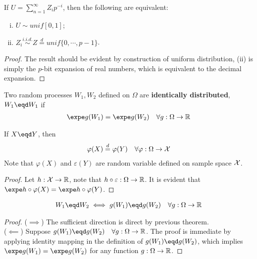\documentclass{article}
\begin{document}
   	\begin{theorem}
   		If $U = \sum_{n=1}^\infty Z_i p^{-i}$, then the following are equivalent:
   		\begin{enumerate}[(i)]
   			\item $U \sim unif[0, 1]$;
   			\item $Z_i \overset{i.i.d.}{\sim} Z \overset{d}{=} unif\{0, \cdots, p-1\}$.
   		\end{enumerate}
   	\end{theorem}
   	
   	\begin{proof}
   		The result should be evident by construction of uniform distribution, (ii) is simply the $p$-bit expansion of real numbers, which is equivalent to the decimal expansion.
   	\end{proof}
   	
   	\begin{definition}
   		Two random processes $W_1, W_2$ defined on $\Omega$ are \textbf{identically distributed}, $W_1 \eqd W_1$ if 
   		\begin{align}
   			\expe g(W_1) = \expe g(W_2) \quad \forall g: \Omega \to \R
   		\end{align}
   	\end{definition}
   	
   	\begin{theorem}[Invariance I]
   		If $X \eqd Y$, then 
   		\begin{align}
   			\varphi(X) \overset{d}{=} \varphi(Y)\quad \forall \varphi: \Omega \to \mathcal{{X}}
   		\end{align}
   		Note that $\varphi(X)$ and $\varepsilon(Y)$ are random variable defined on sample space $\mathcal{{X}}$.
   	\end{theorem}
   	\begin{proof}
   		Let $h: \mathcal{{X}} \to \mathbb{R}$, note that $h \circ \varepsilon: \Omega \to \mathbb{R}$. It is evident that $\expe h \circ \varphi(X) = \expe h \circ \varphi(Y)$.
   	\end{proof}
   	
   	\begin{theorem}[Invariance II]
   		\begin{align}
   			W_1 \eqd W_2 \iff g(W_1) \eqd g(W_2)\quad \forall g: \Omega \to \R
   		\end{align}
   	\end{theorem}
   	
   	\begin{proof}
   		($\implies$) The sufficient direction is direct by previous theorem. \\
   		($\impliedby$) Suppose $g(W_1) \eqd g(W_2)\quad \forall g: \Omega \to \R$. The proof is immediate by applying identity mapping in the definition of $g(W_1) \eqd g(W_2)$, which implies $\expe g(W_1) = \expe g(W_2)$ for any function $g: \Omega \to \mathbb{R}$.
   	\end{proof}
\end{document}
